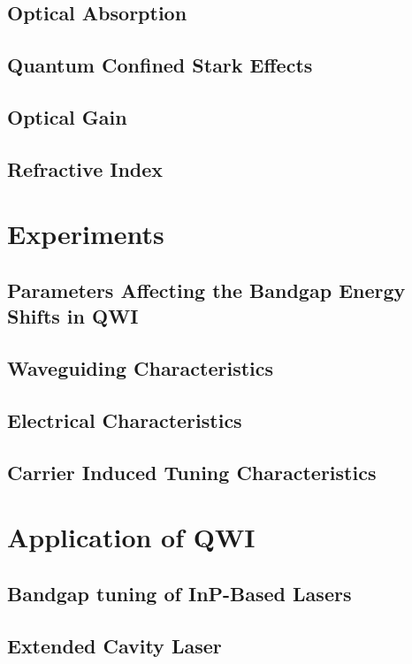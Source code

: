 \documentclass[10pt,final,journal,a4paper,twoside,twocolomn]{IEEEtran}
\begin{document}
\subsection{Optical Absorption}

\subsection{Quantum Confined Stark Effects}

\subsection{Optical Gain}

\subsection{Refractive Index}


\section{Experiments}
\subsection{Parameters Affecting the Bandgap Energy Shifts in QWI}

\subsection{Waveguiding Characteristics}

\subsection{Electrical Characteristics}

\subsection{Carrier Induced Tuning Characteristics}


\section{Application of QWI}
\subsection{Bandgap tuning of InP-Based Lasers}
\subsection{Extended Cavity Laser}
\end{document}

